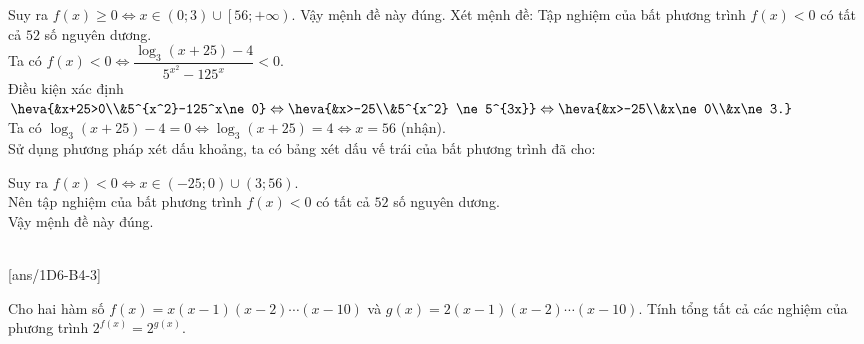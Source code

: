 \begin{ex}
{\begin{itemchoice}
\begin{center}
			\end{center}
			Suy ra $f(x)\ge 0 \Leftrightarrow x\in(0;3)\cup \left[56; +\infty\right)$. Vậy mệnh đề này đúng.
			\itemch Xét mệnh đề: Tập nghiệm của bất phương trình $f(x)<0$ có tất cả $52$ số nguyên dương.\\
			Ta có $f(x)< 0 \Leftrightarrow \dfrac{\log_{3} (x+25) -4}{5^{x^2}-125^x}< 0$.\\
			Điều kiện xác định $\heva{&x+25>0\\&5^{x^2}-125^x\ne 0}
			\Leftrightarrow\heva{&x>-25\\&5^{x^2} \ne 5^{3x}}  
			\Leftrightarrow\heva{&x>-25\\&x\ne0\\&x\ne3.}$\\ 
			Ta có $\log_{3} (x+25)-4=0 \Leftrightarrow \log_{3} (x+25)=4 \Leftrightarrow x=56 $ (nhận).\\
			Sử dụng phương pháp xét dấu khoảng, ta có bảng xét dấu vế trái của bất phương trình đã cho:
			\begin{center}
			\end{center}
			Suy ra $f(x)<0 \Leftrightarrow x\in(-25;0)\cup (3;56)$.\\
			Nên tập nghiệm của bất phương trình $f(x)<0$ có tất cả $52$ số nguyên dương.\\
			Vậy mệnh đề này đúng.
		\end{itemchoice}
	}
\end{ex}


 \\
[ans/1D6-B4-3]

\begin{ex}
	Cho hai hàm số $f(x)=x(x-1)(x-2)\cdots(x-10)$ và $g(x)=2(x-1)(x-2)\cdots(x-10)$. Tính tổng tất cả các nghiệm của phương trình $2^{f(x)}=2^{g(x)}$.
	\\
\end{ex}

